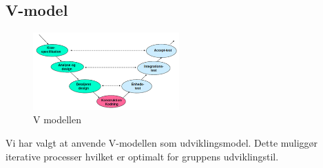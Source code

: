 \subsection{V-model}
\begin{figure}[H]
\centering
\includegraphics[width=0.5\textwidth]{billeder/vmodel}
\caption{V modellen}
\label{fig:vmodel}
\end{figure}
Vi har valgt at anvende V-modellen som udviklingsmodel. Dette muliggør iterative processer hvilket er optimalt for gruppens udviklingstil.